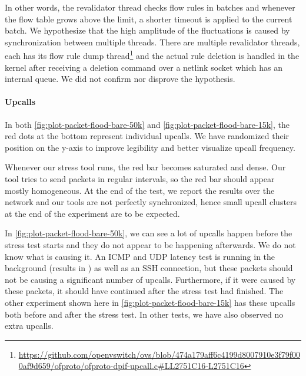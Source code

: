 In other words, the revalidator thread checks flow rules in batches and whenever the flow table grows above the limit, a shorter timeout is applied to the current batch. We hypothesize that the high amplitude of the fluctuations is caused by synchronization between multiple threads. There are multiple revalidator threads, each has its flow rule dump thread\footnote{\url{https://github.com/openvswitch/ovs/blob/474a179aff6c4199d8007910e3f79f000af9d659/ofproto/ofproto-dpif-upcall.c\#LL2751C16-L2751C16}} and the actual rule deletion is handled in the kernel after receiving a deletion command over a netlink socket which has an internal queue. We did not confirm nor disprove the hypothesis.

\paragraph{Upcalls}
In both \cref{fig:plot-packet-flood-bare-50k} and \cref{fig:plot-packet-flood-bare-15k}, the red dots at the bottom represent individual upcalls. We have randomized their position on the y-axis to improve legibility and better visualize upcall frequency.

Whenever our stress tool runs, the red bar becomes saturated and dense. Our tool tries to send packets in regular intervals, so the red bar should appear mostly homogeneous. At the end of the test, we report the results over the network and our tools are not perfectly synchronized, hence small upcall clusters at the end of the experiment are to be expected.

In \cref{fig:plot-packet-flood-bare-50k}, we can see a lot of upcalls happen before the stress test starts and they do not appear to be happening afterwards. We do not know what is causing it. An ICMP and UDP latency test is running in the background (results in ) as well as an SSH connection, but these packets should not be causing a significant number of upcalls. Furthermore, if it were caused by these packets, it should have continued after the stress test had finished. The other experiment shown here in \cref{fig:plot-packet-flood-bare-15k} has these upcalls both before and after the stress test. In other tests, we have also observed no extra upcalls.

